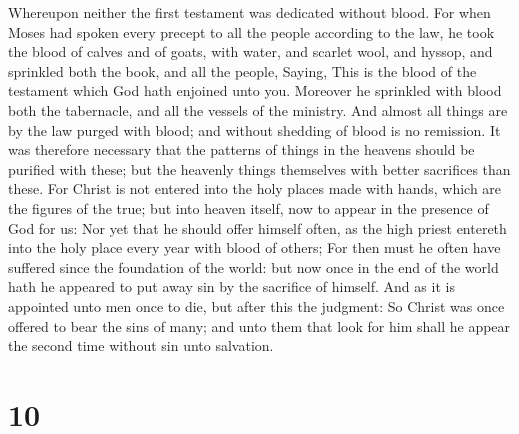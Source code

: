  Whereupon neither the first testament was dedicated
without blood.  For when Moses had spoken every precept
to all the people according to the law, he took the blood of calves and
of goats, with water, and scarlet wool, and hyssop, and sprinkled both
the book, and all the people,  Saying, This is the blood
of the testament which God hath enjoined unto you. 
Moreover he sprinkled with blood both the tabernacle, and all the
vessels of the ministry.  And almost all things are by
the law purged with blood; and without shedding of blood is no
remission.  It was therefore necessary that the patterns
of things in the heavens should be purified with these; but the heavenly
things themselves with better sacrifices than these.  For
Christ is not entered into the holy places made with hands, which are
the figures of the true; but into heaven itself, now to appear in the
presence of God for us:  Nor yet that he should offer
himself often, as the high priest entereth into the holy place every
year with blood of others;  For then must he often have
suffered since the foundation of the world: but now once in the end of
the world hath he appeared to put away sin by the sacrifice of himself.
 And as it is appointed unto men once to die, but after
this the judgment:  So Christ was once offered to bear
the sins of many; and unto them that look for him shall he appear the
second time without sin unto salvation.

\hypertarget{section-9}{%
\section{10}\label{section-9}}

